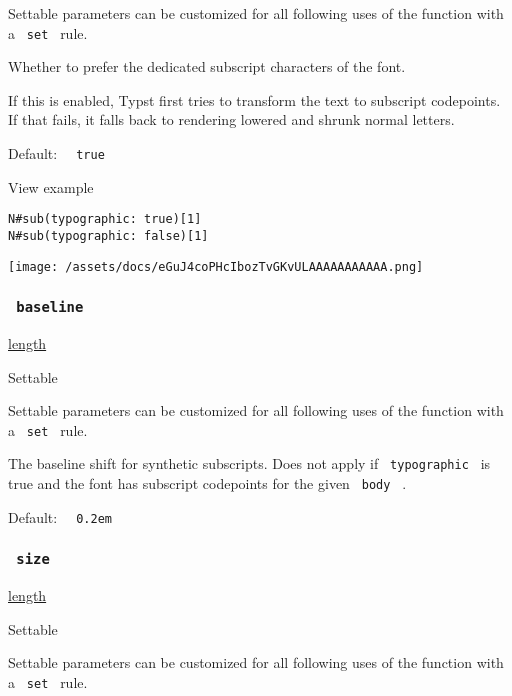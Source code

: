 \label{parameters-typographic-settable-tooltip}
Settable parameters can be customized for all following uses of the
function with a \texttt{\ set\ } rule.

Whether to prefer the dedicated subscript characters of the font.

If this is enabled, Typst first tries to transform the text to subscript
codepoints. If that fails, it falls back to rendering lowered and shrunk
normal letters.

Default: \texttt{\ }{\texttt{\ true\ }}\texttt{\ }


View example

\begin{verbatim}
N#sub(typographic: true)[1]
N#sub(typographic: false)[1]
\end{verbatim}

\texttt{[image: /assets/docs/eGuJ4coPHcIbozTvGKvULAAAAAAAAAAA.png]}

\subsubsection{\texorpdfstring{\texttt{\ baseline\ }}{ baseline }}\label{parameters-baseline}

\href{/docs/reference/layout/length/}{length}

{{ Settable }}

\label{parameters-baseline-settable-tooltip}
Settable parameters can be customized for all following uses of the
function with a \texttt{\ set\ } rule.

The baseline shift for synthetic subscripts. Does not apply if
\texttt{\ typographic\ } is true and the font has subscript codepoints
for the given \texttt{\ body\ } .

Default: \texttt{\ }{\texttt{\ 0.2em\ }}\texttt{\ }

\subsubsection{\texorpdfstring{\texttt{\ size\ }}{ size }}\label{parameters-size}

\href{/docs/reference/layout/length/}{length}

{{ Settable }}

\label{parameters-size-settable-tooltip}
Settable parameters can be customized for all following uses of the
function with a \texttt{\ set\ } rule.

